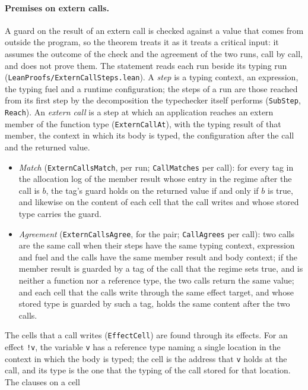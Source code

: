 \documentclass[12pt]{article}
\begin{document}
\paragraph{Premises on extern calls.}
A guard on the result of an extern call is checked against a value that comes
from outside the program, so the theorem treats it as it treats a critical
input: it assumes the outcome of the check and the agreement of the two runs,
call by call, and does not prove them.  The statement reads each run beside its
typing run (\texttt{LeanProofs/ExternCallSteps.lean}).  A \emph{step} is a
typing context, an expression, the typing fuel and a runtime configuration;
the steps of a run are those reached from its first step by the
decomposition the typechecker itself performs (\texttt{SubStep},
\texttt{Reach}).  An \emph{extern call} is a step at which an application
reaches an extern member of the function type (\texttt{ExternCallAt}), with the
typing result of that member, the context in which its body is typed, the
configuration after the call and the returned value.
\begin{itemize}
  \item \emph{Match} (\texttt{ExternCallsMatch}, per run; \texttt{CallMatches}
  per call): for every tag in the allocation log of the member result whose
  entry in the regime after the call is $b$, the tag's guard holds on the
  returned value if and only if $b$ is true, and likewise on the content of each
  cell that the call writes and whose stored type carries the guard.
  \item \emph{Agreement} (\texttt{ExternCallsAgree}, for the pair;
  \texttt{CallAgrees} per call): two calls are the same call when their steps
  have the same typing context, expression and fuel and the calls have the same
  member result and body context; if the member result is guarded by a tag of
  the call that the regime sets true, and is neither a function nor a reference
  type, the two calls return the same value; and each cell that the calls write
  through the same effect target, and whose stored type is guarded by such a
  tag, holds the same content after the two calls.
\end{itemize}
The cells that a call writes (\texttt{EffectCell}) are found through its
effects.  For an effect \texttt{!v}, the variable \texttt{v} has a reference
type naming a single location in the context in which the body is typed; the
cell is the address that \texttt{v} holds at the call, and its type is the one
that the typing of the call stored for that location.  The clauses on a cell
\end{document}
